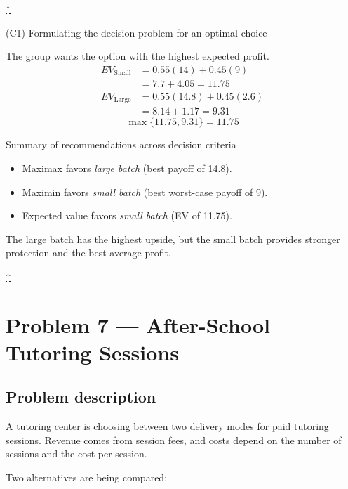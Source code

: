 \documentclass[11pt]{article}
\begin{document}
	
	\hyperref[problem3a-criteria]{↑}
	
	
	
	
	(C1) Formulating the decision problem for an optimal choice
	+
	
	
	The group wants the option with the highest expected profit.
	\[
	\begin{aligned}
		EV_{\text{Small}} &= 0.55(14) + 0.45(9) \\
		&= 7.7 + 4.05 = 11.75 \\
		EV_{\text{Large}} &= 0.55(14.8) + 0.45(2.6) \\
		&= 8.14 + 1.17 = 9.31
	\end{aligned}
	\]
	\[
	\max\{11.75, 9.31\} = 11.75
	\]
	
	Summary of recommendations across decision criteria
	\begin{itemize}
		\item Maximax favors \emph{large batch} (best payoff of 14.8).
		\item Maximin favors \emph{small batch} (best worst-case payoff of 9).
		\item Expected value favors \emph{small batch} (EV of 11.75).
	\end{itemize}
	
	
	
	The large batch has the highest upside, but the small batch provides stronger protection and the best average profit.
	
	
	
	\hyperref[problem3a-criteria]{↑}
	\section*{Problem 7 — After-School Tutoring Sessions}
	
	\label{problem3b}
	
	\subsection*{Problem description}
	
	\label{problem3b-problem}
	
	A tutoring center is choosing between two delivery modes for paid tutoring sessions. Revenue comes from session fees, and costs
	depend on the number of sessions and the cost per session.
	
	
	
	
	
	
	Two alternatives are being compared:
	
	
	
\end{document}
